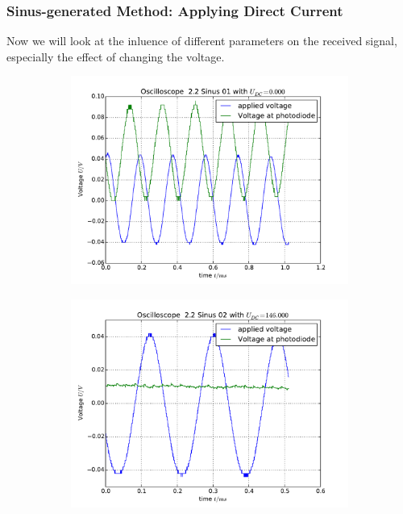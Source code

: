 \subsubsection{Sinus-generated Method: Applying Direct Current}
Now we will look at the inluence of different parameters on
the received signal, especially the effect of changing the
voltage.
\begin{figure}
    \begin{subfigure}[b]{\picwidth}
        \includegraphics[width=\textwidth]{analysis/figures/22sinus01}
        \caption{}
    \end{subfigure}\qquad
    \begin{subfigure}[b]{\picwidth}
        \includegraphics[width=\textwidth]{analysis/figures/22sinus02}

\end{subfigure}
\end{figure}

